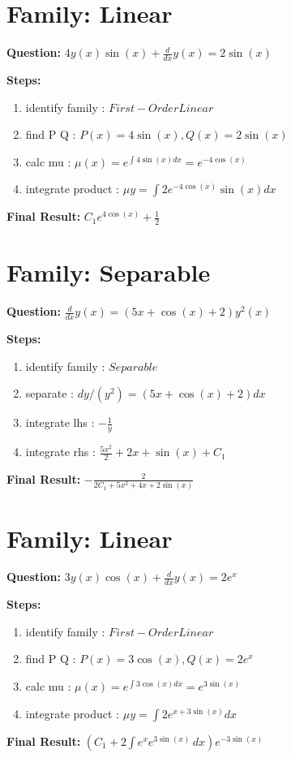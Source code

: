 \documentclass{article}
\begin{document}
\section*{Family: Linear}
\textbf{Question:} $4 y{\left(x \right)} \sin{\left(x \right)} + \frac{d}{d x} y{\left(x \right)} = 2 \sin{\left(x \right)}$

\textbf{Steps:}
\begin{enumerate}
\item identify family :  $First-Order Linear$
\item find P Q :  $P(x)=4 \sin{\left(x \right)}, Q(x)=2 \sin{\left(x \right)}$
\item calc mu :  $\mu(x) = e^{\int 4 \sin{\left(x \right)} dx} = e^{- 4 \cos{\left(x \right)}}$
\item integrate product :  $\mu y = \int 2 e^{- 4 \cos{\left(x \right)}} \sin{\left(x \right)} dx$
\end{enumerate}
\textbf{Final Result:} $C_{1} e^{4 \cos{\left(x \right)}} + \frac{1}{2}$

\section*{Family: Separable}
\textbf{Question:} $\frac{d}{d x} y{\left(x \right)} = \left(5 x + \cos{\left(x \right)} + 2\right) y^{2}{\left(x \right)}$

\textbf{Steps:}
\begin{enumerate}
\item identify family :  $Separable$
\item separate :  $dy / (y^{2}) = (5 x + \cos{\left(x \right)} + 2) dx$
\item integrate lhs :  $- \frac{1}{y}$
\item integrate rhs :  $\frac{5 x^{2}}{2} + 2 x + \sin{\left(x \right)} + C_1$
\end{enumerate}
\textbf{Final Result:} $- \frac{2}{2 C_{1} + 5 x^{2} + 4 x + 2 \sin{\left(x \right)}}$

\section*{Family: Linear}
\textbf{Question:} $3 y{\left(x \right)} \cos{\left(x \right)} + \frac{d}{d x} y{\left(x \right)} = 2 e^{x}$

\textbf{Steps:}
\begin{enumerate}
\item identify family :  $First-Order Linear$
\item find P Q :  $P(x)=3 \cos{\left(x \right)}, Q(x)=2 e^{x}$
\item calc mu :  $\mu(x) = e^{\int 3 \cos{\left(x \right)} dx} = e^{3 \sin{\left(x \right)}}$
\item integrate product :  $\mu y = \int 2 e^{x + 3 \sin{\left(x \right)}} dx$
\end{enumerate}
\textbf{Final Result:} $\left(C_{1} + 2 \int e^{x} e^{3 \sin{\left(x \right)}}\, dx\right) e^{- 3 \sin{\left(x \right)}}$
\end{document}
